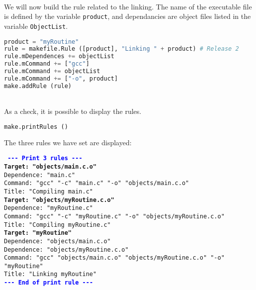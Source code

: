 \documentclass[a4paper,11pt]{extarticle}
\begin{document}
~\\We will now build the rule related to the linking. The name of the executable file is defined by the variable \texttt{product}, and dependancies are object files listed in the variable \texttt{ObjectList}.
\begin{lstlisting}[language=py]
product = "myRoutine"
rule = makefile.Rule ([product], "Linking " + product) # Release 2
rule.mDependences += objectList
rule.mCommand += ["gcc"]
rule.mCommand += objectList
rule.mCommand += ["-o", product]
make.addRule (rule)
\end{lstlisting}

~\\As a check, it is possible to display the rules.
\begin{lstlisting}[language=py]
make.printRules ()
\end{lstlisting}

The three rules we have set are displayed:

\begin{mdframed}[hidealllines=true,backgroundcolor=lightgray!20]
\tt\footnotesize
\textcolor{blue}{\bf{-}{-}{-} Print 3 rules {-}{-}{-}}\\
\textcolor{OliveGreen}{\bf Target: "objects/main.c.o"}\\
\hspace*{1.2em}Dependence: "main.c"\\
\hspace*{1.2em}Command:  "gcc" "-c" "main.c" "-o" "objects/main.c.o"\\
\hspace*{1.2em}Title: "Compiling main.c"\\
\textcolor{OliveGreen}{\bf Target: "objects/myRoutine.c.o"}\\
\hspace*{1.2em}Dependence: "myRoutine.c"\\
\hspace*{1.2em}Command:  "gcc" "-c" "myRoutine.c" "-o" "objects/myRoutine.c.o"\\
\hspace*{1.2em}Title: "Compiling myRoutine.c"\\
\textcolor{OliveGreen}{\bf Target: "myRoutine"}\\
\hspace*{1.2em}Dependence: "objects/main.c.o"\\
\hspace*{1.2em}Dependence: "objects/myRoutine.c.o"\\
\hspace*{1.2em}Command:  "gcc" "objects/main.c.o" "objects/myRoutine.c.o" "-o" "myRoutine"\\
\hspace*{1.2em}Title: "Linking myRoutine"\\
\textcolor{blue}{\bf{-}{-}{-} End of print rule {-}{-}{-}}
\end{mdframed}
\end{document}
